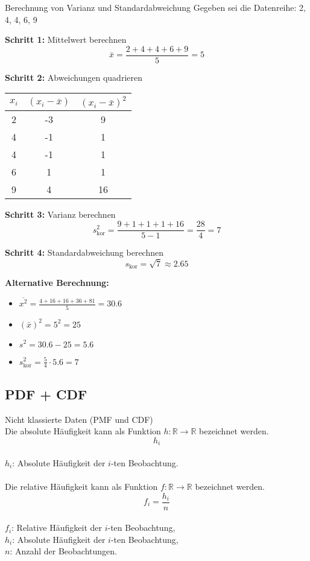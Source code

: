 \begin{example2}{Berechnung von Varianz und Standardabweichung}
Gegeben sei die Datenreihe: 2, 4, 4, 6, 9

\textbf{Schritt 1:} Mittelwert berechnen
$$\bar{x} = \frac{2 + 4 + 4 + 6 + 9}{5} = 5$$

\textbf{Schritt 2:} Abweichungen quadrieren
\begin{center}
\begin{tabular}{|c|c|c|}
\hline
$x_i$ & $(x_i - \bar{x})$ & $(x_i - \bar{x})^2$ \\
\hline
2 & -3 & 9 \\
4 & -1 & 1 \\
4 & -1 & 1 \\
6 & 1 & 1 \\
9 & 4 & 16 \\
\hline
\end{tabular}
\end{center}

\textbf{Schritt 3:} Varianz berechnen
$$s_{\text{kor}}^2 = \frac{9 +1 + 1 + 1 + 16}{5-1} = \frac{28}{4} = 7$$

\textbf{Schritt 4:} Standardabweichung berechnen
$$s_{\text{kor}} = \sqrt{7} \approx 2.65$$

\textbf{Alternative Berechnung:}
\begin{itemize}
    \item $\overline{x^2} = \frac{4 + 16 + 16 + 36 + 81}{5} = 30.6$
    \item $(\bar{x})^2 = 5^2 = 25$
    \item $s^2 = 30.6 - 25 = 5.6$
    \item $s_{\text{kor}}^2 = \frac{5}{4} \cdot 5.6 = 7$
\end{itemize}
\end{example2}

\subsection{PDF + CDF}

\begin{definition}{Nicht klassierte Daten (PMF und CDF)}\\
Die absolute Häufigkeit kann als Funktion $h: \mathbb{R} \rightarrow \mathbb{R}$ bezeichnet werden.
$$
h_{i}
$$
\\
$h_{i}$: Absolute Häufigkeit der $i$-ten Beobachtung.
\\
\\
Die relative Häufigkeit kann als Funktion $f: \mathbb{R} \rightarrow \mathbb{R}$ bezeichnet werden.
$$
f_{i}=\frac{h_{i}}{n}
$$
\\
$f_{i}$: Relative Häufigkeit der $i$-ten Beobachtung, \\
$h_{i}$: Absolute Häufigkeit der $i$-ten Beobachtung, \\
$n$: Anzahl der Beobachtungen.
\end{definition}

